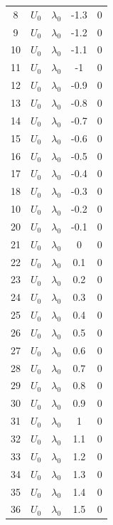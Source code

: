 \documentclass[12pt,letterpaper]{scrreprt}
\begin{document}
\begin{appendices}
\begin{table}[!ht]
{\begin{tabular}{c|c|c|c|c}
8   & $U_0$        & $\lambda_0$ & -1.3  & 0   \\
9  & $U_0$        & $\lambda_0$ & -1.2  & 0   \\
10  & $U_0$        & $\lambda_0$ & -1.1  & 0   \\
11  & $U_0$        & $\lambda_0$ & -1    & 0   \\
12  & $U_0$        & $\lambda_0$ & -0.9  & 0   \\
13  & $U_0$        & $\lambda_0$ & -0.8  & 0   \\
14  & $U_0$        & $\lambda_0$ & -0.7  & 0   \\
15  & $U_0$        & $\lambda_0$ & -0.6  & 0   \\
16  & $U_0$        & $\lambda_0$ & -0.5  & 0   \\
17  & $U_0$        & $\lambda_0$ & -0.4  & 0   \\
18  & $U_0$        & $\lambda_0$ & -0.3  & 0   \\
10  & $U_0$        & $\lambda_0$ & -0.2  & 0   \\
20  & $U_0$        & $\lambda_0$ & -0.1  & 0   \\
21  & $U_0$        & $\lambda_0$ & 0     & 0   \\
22 & $U_0$        & $\lambda_0$ & 0.1   & 0   \\
23  & $U_0$        & $\lambda_0$ & 0.2   & 0   \\
24  & $U_0$        & $\lambda_0$ & 0.3   & 0   \\
25  & $U_0$        & $\lambda_0$ & 0.4   & 0   \\
26  & $U_0$        & $\lambda_0$ & 0.5   & 0   \\
27  & $U_0$        & $\lambda_0$ & 0.6   & 0   \\
28  & $U_0$        & $\lambda_0$ & 0.7   & 0   \\
29  & $U_0$        & $\lambda_0$ & 0.8   & 0   \\
30  & $U_0$        & $\lambda_0$ & 0.9   & 0   \\
31  & $U_0$        & $\lambda_0$ & 1     & 0   \\
32  & $U_0$        & $\lambda_0$ & 1.1   & 0   \\
33  & $U_0$        & $\lambda_0$ & 1.2   & 0   \\
34  & $U_0$        & $\lambda_0$ & 1.3   & 0   \\
35  & $U_0$        & $\lambda_0$ & 1.4   & 0   \\
36  & $U_0$        & $\lambda_0$ & 1.5   & 0   \\

\end{tabular}}
\end{table}
\end{appendices}
\end{document}
